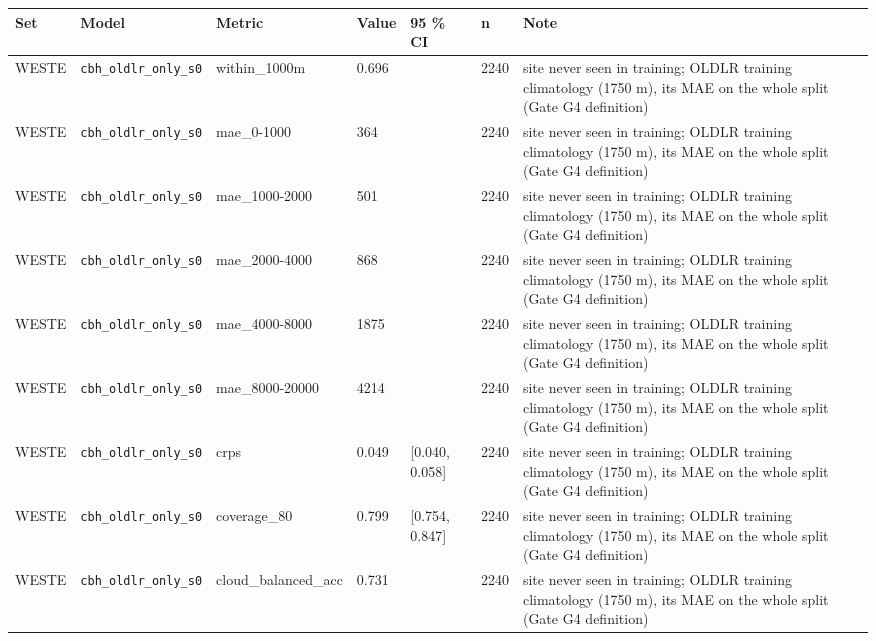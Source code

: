 \begin{center}{\scriptsize\setlength{\tabcolsep}{3pt}
\begin{tabular}{lp{2.4cm}llllp{7.3cm}}
\toprule
Set & Model & Metric & Value & 95 \% CI & n & Note \\
\midrule
WESTE & \texttt{cbh\_\allowbreak{}oldlr\_\allowbreak{}only\_\allowbreak{}s0} & within\_1000m & 0.696 &  & 2240 & site never seen in training; OLDLR training climatology (1750 m), its MAE on the whole split (Gate G4 definition) \\
WESTE & \texttt{cbh\_\allowbreak{}oldlr\_\allowbreak{}only\_\allowbreak{}s0} & mae\_0-1000 & 364 &  & 2240 & site never seen in training; OLDLR training climatology (1750 m), its MAE on the whole split (Gate G4 definition) \\
WESTE & \texttt{cbh\_\allowbreak{}oldlr\_\allowbreak{}only\_\allowbreak{}s0} & mae\_1000-2000 & 501 &  & 2240 & site never seen in training; OLDLR training climatology (1750 m), its MAE on the whole split (Gate G4 definition) \\
WESTE & \texttt{cbh\_\allowbreak{}oldlr\_\allowbreak{}only\_\allowbreak{}s0} & mae\_2000-4000 & 868 &  & 2240 & site never seen in training; OLDLR training climatology (1750 m), its MAE on the whole split (Gate G4 definition) \\
WESTE & \texttt{cbh\_\allowbreak{}oldlr\_\allowbreak{}only\_\allowbreak{}s0} & mae\_4000-8000 & 1875 &  & 2240 & site never seen in training; OLDLR training climatology (1750 m), its MAE on the whole split (Gate G4 definition) \\
WESTE & \texttt{cbh\_\allowbreak{}oldlr\_\allowbreak{}only\_\allowbreak{}s0} & mae\_8000-20000 & 4214 &  & 2240 & site never seen in training; OLDLR training climatology (1750 m), its MAE on the whole split (Gate G4 definition) \\
WESTE & \texttt{cbh\_\allowbreak{}oldlr\_\allowbreak{}only\_\allowbreak{}s0} & crps & 0.049 & [0.040, 0.058] & 2240 & site never seen in training; OLDLR training climatology (1750 m), its MAE on the whole split (Gate G4 definition) \\
WESTE & \texttt{cbh\_\allowbreak{}oldlr\_\allowbreak{}only\_\allowbreak{}s0} & coverage\_80 & 0.799 & [0.754, 0.847] & 2240 & site never seen in training; OLDLR training climatology (1750 m), its MAE on the whole split (Gate G4 definition) \\
WESTE & \texttt{cbh\_\allowbreak{}oldlr\_\allowbreak{}only\_\allowbreak{}s0} & cloud\_balanced\_acc & 0.731 &  & 2240 & site never seen in training; OLDLR training climatology (1750 m), its MAE on the whole split (Gate G4 definition) \\

\end{tabular}}
\end{center}
